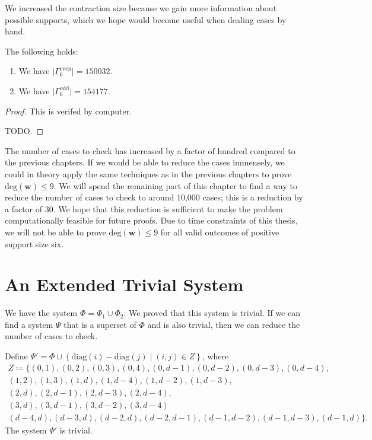 We increased the contraction size because we gain more information about possible supports, which we hope would become useful when dealing cases by hand.

\begin{proposition}
    The following holds:
    \begin{enumerate}
        \item We have \( \lvert \Gamma^{\mathrm{even}}_6 \rvert  = 150032\).
        \item We have \( \lvert \Gamma^{\mathrm{odd}}_6 \rvert  = 154177\).
    \end{enumerate}
\end{proposition}

\begin{proof}
    This is verifed by computer. 
    
    TODO. 
\end{proof}

The number of cases to check has increased by a factor of hundred compared to the previous chapters. If we would be able to reduce the cases immensely, we could in theory apply the same techniques as in the previous chapters to prove \( \mathrm{deg}(\mathbf w) \leq 9 \). We will spend the remaining part of this chapter to find a way to reduce the number of cases to check to around 10,000 cases; this is a reduction by a factor of 30. We hope that this reduction is sufficient to make the problem computationally feasible for future proofs. Due to time constraints of this thesis, we will not be able to prove \( \mathrm{deg}(\mathbf w) \leq 9 \) for all valid outcomes of positive support size six.

\section{An Extended Trivial System}

We have the system \( \Phi = \Phi_1 \cup \Phi_2 \). We proved that this system is trivial. If we can find a system \( \Psi \) that is a superset of \( \Phi \) and is also trivial, then we can reduce the number of cases to check. 

\begin{proposition}
    Define \( \Psi' = \Phi \cup \left\{ \mathrm{diag}(i) - \mathrm{diag}(j) \mid (i,j) \in Z \right\} \), where 
    \begin{gather*}
        Z \coloneqq \{ (0,1), (0,2), (0,3), (0,4), (0,d-1), (0,d-2), (0,d-3), (0,d-4),\\ (1,2), (1,3), (1, d), (1,d-4), (1,d-2), (1,d-3),\\ (2,d), (2,d-1), (2,d-3), (2, d-4),\\ (3,d), (3,d-1), (3,d-2), (3, d-4)\\
        (d-4,d), (d-3,d), (d-2,d), (d-2,d-1), (d-1,d-2), (d-1,d-3), (d-1,d)\}.
    \end{gather*}
    The system \( \Psi' \) is trivial.
\end{proposition}

